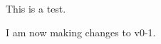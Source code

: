 \documentclass{article}
\begin{document}
    This is a test.

    I am now making changes to v0-1.
\end{document}

